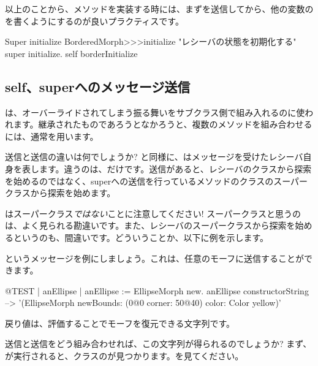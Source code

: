\documentclass[a4paper,10pt,twoside]{book}
\begin{document}
以上のことから、メソッドを実装する時には、まずを送信してから、他の変数のを書くようにするのが良いプラクティスです。


\begin{method}[morphinit]{Super initialize}
BorderedMorph>>>initialize
	"レシーバの状態を初期化する"
	super initialize.
	self borderInitialize
\end{method}


\subsection{self、superへのメッセージ送信}

\super{}は、オーバーライドされてしまう振る舞いをサブクラス側で組み入れるのに使われます。継承されたものであろうとなかろうと、複数のメソッドを組み合わせるには、通常\self{}を用います。

\self 送信と\super 送信の違いは何でしょうか? \self と同様に、\super はメッセージを受けたレシーバ自身を表します。違うのは、だけです。\super 送信があると、レシーバのクラスから探索を始めるのではなく、superへの送信を行っているメソッドのクラスのスーパークラスから探索を始めます。

\super はスーパークラス\emph{ではない}ことに注意してください! スーパークラスと思うのは、よく見られる勘違いです。また、レシーバのスーパークラスから探索を始めるというのも、間違いです。どういうことか、以下に例を示します。

というメッセージを例にしましょう。これは、任意のモーフに送信することができます。
\begin{code}{@TEST | anEllipse | anEllipse := EllipseMorph new.}
anEllipse constructorString --> '(EllipseMorph newBounds: (0@0 corner: 50@40) color: Color yellow)'
\end{code}
戻り値は、評価することでモーフを復元できる文字列です。

\self 送信と\super 送信をどう組み合わせれば、この文字列が得られるのでしょうか? まず、が実行されると、クラスのが見つかります。を見てください。
\end{document}

